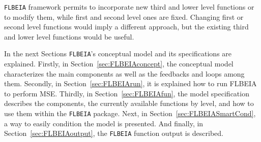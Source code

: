 \texttt{FLBEIA} framework permits to incorporate new third and lower level functions or to modify them, while first and second level ones are fixed. Changing first or second level functions would imply a different approach, but the existing third and lower level functions would be useful.

In the next Sections \texttt{FLBEIA}'s conceptual model and its specifications are explained. Firstly, in Section~\ref{sec:FLBEIAconcept}, the conceptual model characterizes the main components as well as the feedbacks and loops among them. Secondly, in Section~\ref{sec:FLBEIArun}, it is explained how to run FLBEIA to perform MSE. Thirdly, in Section~\ref{sec:FLBEIAfun}, the model specification describes the components, the currently available functions by level, and how to use them within the \texttt{FLBEIA} package. Next, in Section~\ref{sec:FLBEIASmartCond}, a way to easily condition the model is presented. And finally, in Section~\ref{sec:FLBEIAoutput}, the \texttt{FLBEIA} function output is described.
